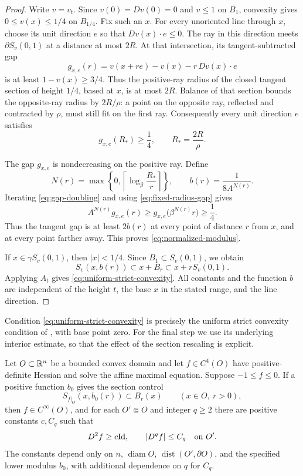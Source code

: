 \begin{proof}
Write \(v=v_t\).  Since \(v(0)=Dv(0)=0\) and \(v\le1\) on
\(\overline{B_1}\), convexity gives \(0\le v(x)\le1/4\) on
\(B_{1/4}\).  Fix such an \(x\).
For every unoriented line through \(x\), choose its unit direction
\(e\) so that \(Dv(x)\cdot e\le0\).
The ray in this direction meets \(\partial S_v(0,1)\) at a distance
at most \(2R\).  At that intersection, its tangent-subtracted gap
\[
 g_{x,e}(r)=v(x+re)-v(x)-r\,Dv(x)\cdot e
\]
is at least \(1-v(x)\ge3/4\).
Thus the positive-ray radius of the closed tangent section of height
\(1/4\), based at \(x\), is at most \(2R\).
Balance of that section bounds the opposite-ray radius by
\(2R/\rho\): a point on the opposite ray, reflected and contracted
by \(\rho\), must still fit on the first ray.
Consequently every unit direction \(e\) satisfies
\begin{equation}\label{eq:fixed-radius-gap}
 g_{x,e}(R_*)\ge\frac14,\qquad R_*=\frac{2R}{\rho}.
\end{equation}

The gap \(g_{x,e}\) is nondecreasing on the positive ray.  Define
\begin{equation}\label{eq:explicit-modulus}
 N(r)=\max\left\{0,\left\lceil\log_\beta\frac{R_*}{r}\right\rceil\right\},
 \qquad b(r)=\frac{1}{8A^{N(r)}}.
\end{equation}
Iterating \eqref{eq:gap-doubling} and using
\eqref{eq:fixed-radius-gap} gives
\[
 A^{N(r)}g_{x,e}(r)
 \ge g_{x,e}\bigl(\beta^{N(r)}r\bigr)
 \ge\frac14.
\]
Thus the tangent gap is at least \(2b(r)\) at every point of
distance \(r\) from \(x\), and at every point farther away.
This proves \eqref{eq:normalized-modulus}.

If \(x\in\gamma S_v(0,1)\), then \(|x|<1/4\).  Since
\(B_1\subset S_v(0,1)\), we obtain
\[
 S_v(x,b(r))\subset x+B_r\subset x+rS_v(0,1).
\]
Applying \(A_t\) gives \eqref{eq:uniform-strict-convexity}.
All constants and the function \(b\) are independent of the height
\(t\), the base \(x\) in the stated range, and the line direction.
\end{proof}

Condition \eqref{eq:uniform-strict-convexity} is precisely the
uniform strict convexity condition of
\cite[Condition~(4.10)]{TW2000}, with base point zero.
For the final step we use its underlying interior estimate, so that
the effect of the section rescaling is explicit.

\begin{theorem}\label{thm:tw-interior}
Let \(O\subset\mathbb R^n\) be a bounded convex domain and let
\(f\in C^4(O)\) have positive-definite Hessian and solve the affine
maximal equation.  Suppose \(-1\le f\le0\).
If a positive function \(b_0\) gives the section control
\[
 S_{f|_O}(x,b_0(r))\subset B_r(x)
 \qquad(x\in O,\ r>0),
\]
then \(f\in C^\infty(O)\), and for each \(O'\Subset O\) and
integer \(q\ge2\) there are
positive constants \(c,C_q\) such that
\[
 D^2f\ge c\mathrm{Id},\qquad |D^qf|\le C_q
 \quad\hbox{on }O'.
\]
The constants depend only on \(n\), \(\operatorname{diam}O\),
\(\operatorname{dist}(O',\partial O)\), and the specified lower
modulus \(b_0\), with additional dependence on \(q\) for \(C_q\).
\end{theorem}

